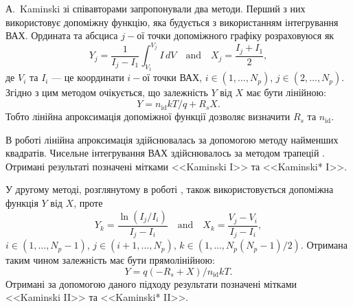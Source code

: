 А.~Kaminski зі співавторами \cite{Kaminski} запропонували два методи.
Перший з них використовує допоміжну функцію, яка будується з використанням інтегрування ВАХ.
Ордината та абсциса $j-$ої точки допоміжного графіку розраховуюся як
\begin{equation}
\label{eqKam1}
Y_j=\frac{1}{I_j-I_1}\int_{V_1}^{V_j}I\,dV \quad\text{and}\quad X_j=\frac{I_j+I_1}{2},
\end{equation}
де
$V_i$ та $I_i$ --- це координати $i-$ої точки ВАХ,
$i\in(1,\ldots, N_p)$,
$j\in(2,\ldots, N_p)$.
Згідно з цим методом очікується, що залежність $Y$ від $X$ має бути лінійною:
\begin{equation}
\label{eqKam1Det}
Y=n_\mathrm{id}kT/q+R_sX.
\end{equation}
Тобто лінійна апроксимація допоміжної функції дозволяє визначити $R_s$ та $n_\mathrm{id}$.

В роботі лінійна апроксимація здійснювалась за допомогою методу найменших квадратів.
Чисельне інтегрування ВАХ здійснювалось за методом трапецій \cite[с.~98]{KalitkinBook}.
Отримані результаті позначені мітками <<Kaminski I>> та <<Kaminski* I>>.

У другому методі, розглянутому в роботі \cite{Kaminski}, також використовується допоміжна функція $Y$ від $X$, проте
\begin{equation}
\label{eqKam2}
Y_k=\frac{\ln(I_j/I_i)}{I_j-I_i} \quad\text{and}\quad X_k=\frac{V_j-V_i}{I_j-I_i},
\end{equation}
$i\in(1,\ldots, N_p-1)$,
$j\in(i+1,\ldots, N_p)$,
$k\in(1,\ldots, N_p(N_p-1)/2)$.
Отримана таким чином залежність має бути прямолінійною:
\begin{equation}
\label{eqKam2Det}
Y=q(-R_s+X)/n_\mathrm{id}kT.
\end{equation}
Отримані за допомогою даного підходу результати позначені мітками <<Kaminski II>> та <<Kaminski* II>>.

